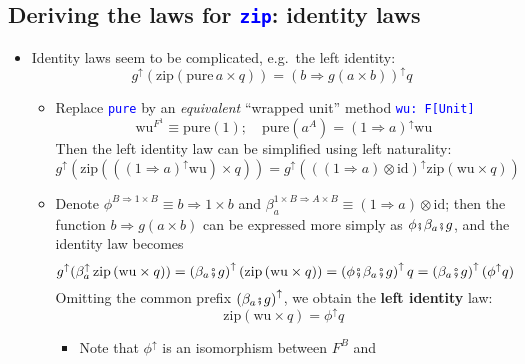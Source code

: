 \subsection{Deriving the laws for \texttt{\textcolor{blue}{\footnotesize{}zip}}:
identity laws}
\begin{itemize}
\item \vspace{-0.2cm}Identity laws seem to be complicated, e.g.\ the left
identity:{\footnotesize{}
\[
g^{\uparrow}\left(\text{zip}\left(\text{pure}\,a\times q\right)\right)=\left(b\Rightarrow g\left(a\times b\right)\right)^{\uparrow}q
\]
}{\footnotesize\par}
\begin{itemize}
\item Replace \texttt{\textcolor{blue}{\footnotesize{}pure}} by an \emph{equivalent}
``wrapped unit'' method \texttt{\textcolor{blue}{\footnotesize{}wu:\ F{[}Unit{]}}}{\footnotesize{}
\[
\text{wu}^{F^{1}}\equiv\text{pure}\left(1\right);\quad\text{pure}(a^{A})=\left(1\Rightarrow a\right)^{\uparrow}\text{wu}
\]
}Then the left identity law can be simplified using left naturality:{\footnotesize{}
\[
g^{\uparrow}\left(\text{zip}\left((\left(1\Rightarrow a\right)^{\uparrow}\text{wu})\times q\right)\right)=g^{\uparrow}\left(\left((1\Rightarrow a)\otimes\text{id}\right)^{\uparrow}\text{zip}\left(\text{wu}\times q\right)\right)
\]
}{\footnotesize\par}
\item Denote {\footnotesize{}$\phi^{B\Rightarrow1\times B}\equiv b\Rightarrow1\times b$}
and {\footnotesize{}$\beta_{a}^{1\times B\Rightarrow A\times B}\equiv\left(1\Rightarrow a\right)\otimes\text{id}$};
then the function {\footnotesize{}$b\Rightarrow g\left(a\times b\right)$}
can be expressed more simply as {\footnotesize{}$\phi\bef\beta_{a}\bef g$},
and the identity law becomes{\footnotesize{}
\[
g^{\uparrow}(\beta_{a}^{\uparrow}\,\text{zip}\left(\text{wu}\times q\right))=\left(\beta_{a}\bef g\right)^{\uparrow}\left(\text{zip}\left(\text{wu}\times q\right)\right)=\left(\phi\bef\beta_{a}\bef g\right)^{\uparrow}q=\left(\beta_{a}\bef g\right)^{\uparrow}(\phi^{\uparrow}q)
\]
}Omitting the common prefix {\footnotesize{}$\left(\beta_{a}\bef g\right)^{\uparrow}$},
we obtain the \textbf{left identity} law:{\footnotesize{}
\[
\text{zip}\left(\text{wu}\times q\right)=\phi^{\uparrow}q
\]
}{\footnotesize\par}
\begin{itemize}
\item Note that $\phi^{\uparrow}$ is an isomorphism between $F^{B}$ and

\end{itemize}
\end{itemize}
\end{itemize}
